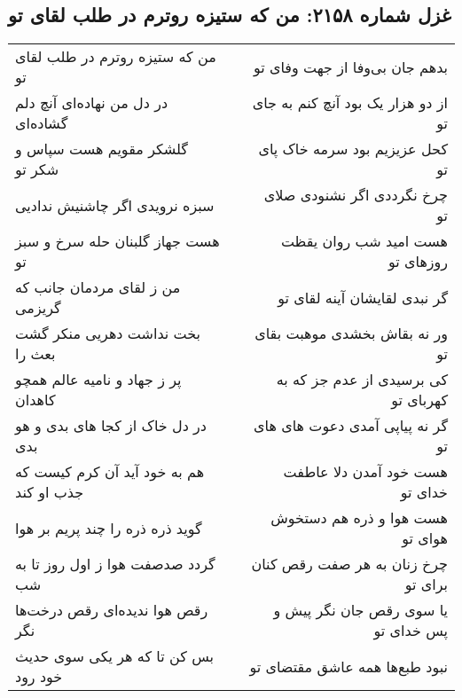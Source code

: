 \begin{center}
\section*{غزل شماره ۲۱۵۸: من که ستیزه روترم در طلب لقای تو}
\label{sec:2158}
\begin{longtable}{l p{0.5cm} r}
من که ستیزه روترم در طلب لقای تو
&&
بدهم جان بی‌وفا از جهت وفای تو
\\
در دل من نهاده‌ای آنچ دلم گشاده‌ای
&&
از دو هزار یک بود آنچ کنم به جای تو
\\
گلشکر مقویم هست سپاس و شکر تو
&&
کحل عزیزیم بود سرمه خاک پای تو
\\
سبزه نرویدی اگر چاشنیش ندادیی
&&
چرخ نگرددی اگر نشنودی صلای تو
\\
هست جهاز گلبنان حله سرخ و سبز تو
&&
هست امید شب روان یقظت روزهای تو
\\
من ز لقای مردمان جانب که گریزمی
&&
گر نبدی لقایشان آینه لقای تو
\\
بخت نداشت دهریی منکر گشت بعث را
&&
ور نه بقاش بخشدی موهبت بقای تو
\\
پر ز جهاد و نامیه عالم همچو کاهدان
&&
کی برسیدی از عدم جز که به کهربای تو
\\
در دل خاک از کجا های بدی و هو بدی
&&
گر نه پیاپی آمدی دعوت های های تو
\\
هم به خود آید آن کرم کیست که جذب او کند
&&
هست خود آمدن دلا عاطفت خدای تو
\\
گوید ذره ذره را چند پریم بر هوا
&&
هست هوا و ذره هم دستخوش هوای تو
\\
گردد صدصفت هوا ز اول روز تا به شب
&&
چرخ زنان به هر صفت رقص کنان برای تو
\\
رقص هوا ندیده‌ای رقص درخت‌ها نگر
&&
یا سوی رقص جان نگر پیش و پس خدای تو
\\
بس کن تا که هر یکی سوی حدیث خود رود
&&
نبود طبع‌ها همه عاشق مقتضای تو
\\
\end{longtable}
\end{center}
